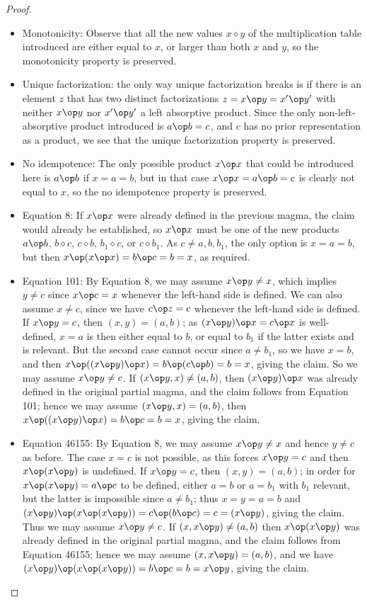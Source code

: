 \begin{proof}
\begin{itemize}
  \item Monotonicity: Observe that all the new values $x \diamond y$ of the multiplication table introduced are either equal to $x$, or larger than both $x$ and $y$, so the monotonicity property is preserved.
  \item Unique factorization: the only way unique factorization breaks is if there is an element $z$ that has two distinct factorizations $z = x \op y = x' \op y'$ with neither $x \op y$ nor $x' \op y'$ a left absorptive product.  Since the only non-left-absorptive product introduced is $a \op b = c$, and $c$ has no prior representation as a product, we see that the unique factorization property is preserved.
  \item No idempotence: The only possible product $x \op x$ that could be introduced here is $a \op b$ if $x=a=b$, but in that case $x \op x = a \op b = c$ is clearly not equal to $x$, so the no idempotence property is preserved.
  \item Equation 8: If $x \op x$ were already defined in the previous magma, the claim would already be established, so $x \op x$ must be one of the new products $a \op b$, $b \diamond c$, $c \diamond b$, $b_1 \diamond c$, or $c \diamond b_1$.  As $c \neq a,b,b_1$, the only option is $x = a = b$, but then $x \op (x \op x) = b \op c = b = x$, as required.
  \item Equation 101: By Equation 8, we may assume $x \op y \neq x$, which implies $y \neq c$ since $x \op c = x$ whenever the left-hand side is defined.  We can also assume $x \neq c$, since we have $c \op z = c$ whenever the left-hand side is defined.  If $x \op y = c$, then $(x,y) = (a,b)$; as $(x \op y) \op x = c \op x$ is well-defined, $x=a$ is then either equal to $b$, or equal to $b_1$ if the latter exists and is relevant.  But the second case cannot occur since $a \neq b_1$, so we have $x = b$, and then $x \op ((x \op y) \op x) = b \op (c \op b) = b = x$, giving the claim.  So we may assume $x \op y \neq c$.  If $(x \op y, x) \neq (a,b)$, then $(x \op y) \op x$ was already defined in the original partial magma, and the claim follows from Equation 101; hence we may assume $(x \op y, x) = (a,b)$, then $x \op ((x \op y) \op x) = b \op c = b = x$, giving the claim.
  \item Equation 46155: By Equation 8, we may assume $x \op y \neq x$ and hence $y \neq c$ as before.  The case $x=c$ is not possible, as this forces $x \op y = c$ and then $x \op (x \op y)$ is undefined.  If $x \op y = c$, then $(x,y) = (a,b)$; in order for $x \op (x \op y) = a \op c$ to be defined, either $a=b$ or $a=b_1$ with $b_1$ relevant, but the latter is impossible since $a \neq b_1$; thus $x=y=a=b$ and $(x \op y) \op (x \op (x \op y)) = c \op (b \op c) = c = (x \op y)$, giving the claim.  Thus we may assume $x \op y \neq c$.  If $(x, x \op y) \neq (a,b)$ then $x \op (x \op y)$ was already defined in the original partial magma, and the claim follows from Equation 46155; hence we may assume $(x, x \op y) = (a,b)$, and we have $(x \op y) \op (x \op (x \op y)) = b \op c = b = x \op y$, giving the claim.

\end{itemize}
\end{proof}
